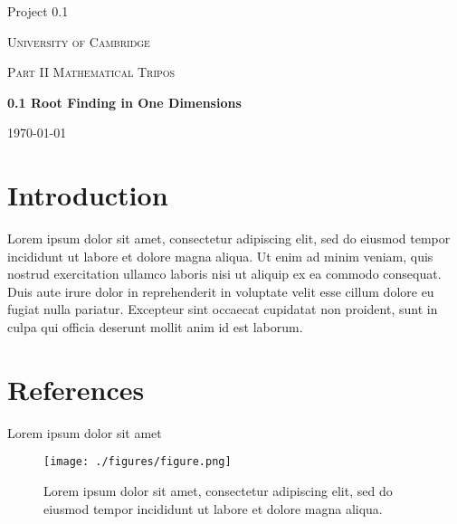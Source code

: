 \documentclass{article}
\begin{document}
    \begin{titlepage}
        \begin{flushleft}
            Project 0.1
        \end{flushleft}
        \vfill
        \centering
        {\scshape\LARGE University of Cambridge \par}
        \vspace{1cm}
        {\scshape\Large Part II Mathematical Tripos \par}
        \vspace{1.5cm}
        {\huge\bfseries 0.1 Root Finding in One Dimensions \par}
        \vspace{2cm}

        \vfill
        {\large \today\par}
    \end{titlepage}
  
  \section{Introduction}
  
  Lorem ipsum dolor sit amet, consectetur adipiscing elit, sed do eiusmod tempor incididunt ut labore et dolore magna aliqua. Ut enim ad minim veniam, quis nostrud exercitation ullamco laboris nisi ut aliquip ex ea commodo consequat. Duis aute irure dolor in reprehenderit in voluptate velit esse cillum dolore eu fugiat nulla pariatur. Excepteur sint occaecat cupidatat non proident, sunt in culpa qui officia deserunt mollit anim id est laborum. \cite{xu}

  \newpage
  \clearpage
  \section{References}
  \begingroup
    \renewcommand{\section}[2]{}
    
    
  \endgroup


  \newpage
  \section{Appendix}
    \subsection{Lorem ipsum dolor sit amet}
    \label{testRK4}

    \begin{figure}[!htbp]
      \texttt{[image: ./figures/figure.png]}
      \caption{Lorem ipsum dolor sit amet, consectetur adipiscing elit, sed do eiusmod tempor incididunt ut labore et dolore magna aliqua.}
    \end{figure}

    \inputminted[breaklines]{matlab}{./build/code.m}
  
  
\end{document}
